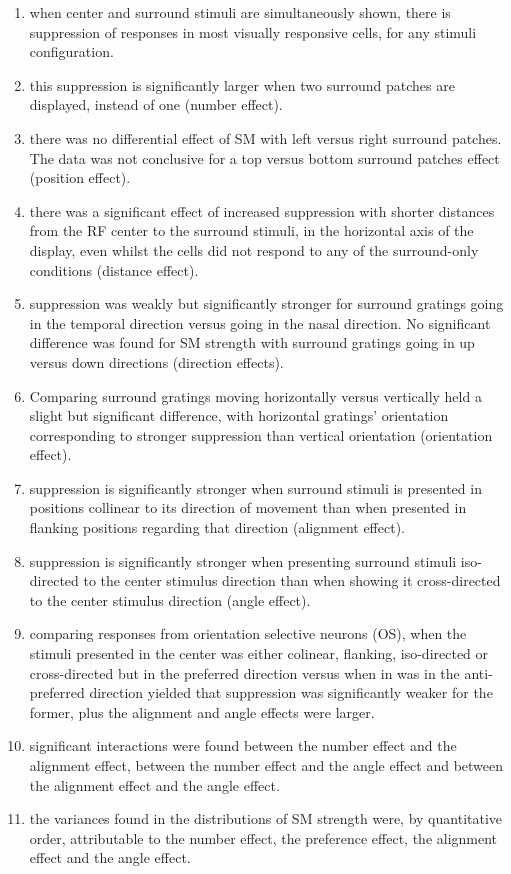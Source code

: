 \begin{enumerate}
\item when center and surround stimuli are simultaneously shown, there is suppression of responses in most visually responsive cells, for any stimuli configuration.
\item this suppression is significantly larger when two surround patches are displayed, instead of one (number effect).
\item there was no differential effect of SM with left versus right surround patches. The data was not conclusive for a top versus bottom surround patches effect (position effect).
\item there was a significant effect of increased suppression with shorter distances from the RF center to the surround stimuli, in the horizontal axis of the display, even whilst the cells did not respond to any of the surround-only conditions (distance effect).
\item suppression was weakly but significantly stronger for surround gratings going in the temporal direction versus going in the nasal direction. No significant difference was found for SM strength with surround gratings going in up versus down directions (direction effects).
\item Comparing surround gratings moving horizontally versus vertically held a slight but significant difference, with horizontal gratings' orientation corresponding to stronger suppression than vertical orientation (orientation effect).
\item suppression is significantly stronger when surround stimuli is presented in positions collinear to its direction of movement than when presented in flanking positions regarding that direction (alignment effect).
\item suppression is significantly stronger when presenting surround stimuli iso-directed to the center stimulus direction than when showing it cross-directed to the center stimulus direction (angle effect).
\item comparing responses from orientation selective neurons (OS), when the stimuli presented in the center was either colinear, flanking, iso-directed or cross-directed but in the preferred direction versus when in was in the anti-preferred direction yielded that suppression was significantly weaker for the former, plus the alignment and angle effects were larger. 
\item significant interactions were found between the number effect and the alignment effect, between the number effect and the angle effect and between the alignment effect and the angle effect. 
\item the variances found in the distributions of SM strength were, by quantitative order, attributable to the number effect, the preference effect, the alignment effect and the angle effect.
\end{enumerate}

